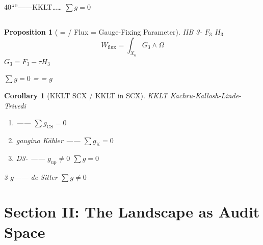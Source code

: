 \documentclass[12pt,a4paper]{article}
\theoremstyle{plain}
\newtheorem{proposition}[theorem]{ Proposition}
\newtheorem{corollary}[theorem]{ Corollary}
\theoremstyle{definition}
\newcommand{\Om}{\Omega}
\begin{document}
\begin{honestcrit}
40``''——KKLT……
\textbf{}
$\sum g = 0$ 

\end{honestcrit}


\subsection{}

\begin{proposition}[ =  / Flux = Gauge-Fixing Parameter]
 IIB 3- $F_3$  $H_3$
\begin{equation}
    W_{\text{flux}} = \int_{X_6} G_3 \wedge \Om
\end{equation}
 $G_3 = F_3 - \tau H_3$

\textbf{} $\sum g = 0$ 
 =  =  $g$ 
\end{proposition}

\begin{corollary}[KKLT  SCX  / KKLT in SCX]
KKLT Kachru-Kallosh-Linde-Trivedi
\begin{enumerate}
    \item \textbf{}  —— $\sum g_{\text{CS}} = 0$
    \item \textbf{}  gaugino  Kähler  —— $\sum g_{\text{K}} = 0$
    \item \textbf{}  D3- —— $g_{\text{up}} \neq 0$ $\sum g = 0$
\end{enumerate}

3 $g$—— de Sitter \textbf{}
$\sum g \neq 0$
\end{corollary}

\newpage


\section{}
\section*{Section II: The Landscape as Audit Space}
\end{document}
